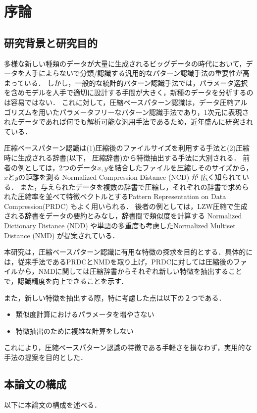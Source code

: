 \chapter{序論}
\section{研究背景と研究目的} %
\label{sec:研究背景と研究目的}


多様な新しい種類のデータが大量に生成されるビッグデータの時代において，データを人手によらないで分類/認識する汎用的なパターン認識手法の重要性が高まっている．
しかし，一般的な統計的パターン認識手法では，パラメータ選択を含めモデルを人手で適切に設計する手間が大きく，新種のデータを分析するのは容易ではない．
これに対して，圧縮ベースパターン認識は，データ圧縮アルゴリズムを用いたパラメータフリーなパターン認識手法であり，1次元に表現されたデータであれば何でも解析可能な汎用手法であるため，近年盛んに研究されている．

圧縮ベースパターン認識は(1)圧縮後のファイルサイズを利用する手法と(2)圧縮時に生成される辞書(以下，
圧縮辞書)から特徴抽出する手法に大別される．
前者の例としては，2つのデータ$x,y$を結合したファイルを圧縮しそのサイズから，$x$と$y$の距離を測る Normalized Compression Distance (NCD) \cite{NCD} が
広く知られている．
また，与えられたデータを複数の辞書で圧縮し，それぞれの辞書で求められた圧縮率を並べて特徴ベクトルとするPattern Representation on Data Compression(PRDC) \cite{PRDC} もよく用いられる．
後者の例としては，LZW圧縮で生成される辞書をデータの要約とみなし，辞書間で類似度を計算する Normalized Dictionary Distance (NDD) \cite{NDD}や単語の多重度も考慮したNormalized Multiset Distance (NMD) \cite{NMD}が提案されている．

本研究は，圧縮ベースパターン認識に有用な特徴の探求を目的とする．具体的には，従来手法であるPRDCとNMDを取り上げ，PRDCに対しては圧縮後のファイルから，NMDに関しては圧縮辞書からそれぞれ新しい特徴を抽出することで，認識精度を向上できることを示す．

また，新しい特徴を抽出する際，特に考慮した点は以下の２つである．
\begin{itemize}
	\item 類似度計算におけるパラメータを増やさない
	\item 特徴抽出のために複雑な計算をしない
\end{itemize}
これにより，圧縮ベースパターン認識の特徴である手軽さを損なわず，実用的な手法の提案を目的とした．


\section{本論文の構成} %
\label{sec:本論文の構成}
以下に本論文の構成を述べる．

